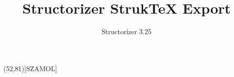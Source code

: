 \documentclass[a4paper,10pt]{article}
\title{Structorizer StrukTeX Export}
\author{Structorizer 3.25}
\begin{document}
\begin{struktogramm}(52,81)[SZAMOL]
   \whileend
  \change
  \ifend
\end{struktogramm}
\end{document}
